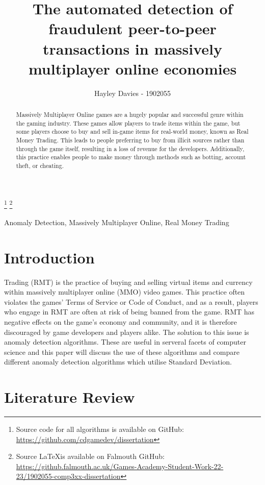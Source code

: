 \documentclass[journal]{IEEEtran}
\begin{document}
\title{The automated detection of fraudulent peer-to-peer transactions in massively multiplayer online economies}
\author{Hayley Davies - 1902055}

\maketitle
\footnote{Source code for all algorithms is available on GitHub: \url{https://github.com/cdgamedev/dissertation}}
\footnote{Source \LaTeX is available on Falmouth GitHub: \url{https://github.falmouth.ac.uk/Games-Academy-Student-Work-22-23/1902055-comp3xx-dissertation}}

\begin{abstract}
Massively Multiplayer Online games are a hugely popular and successful genre within the gaming industry. These games allow players to trade items within the game, but some players choose to buy and sell in-game items for real-world money, known as Real Money Trading. This leads to people preferring to buy from illicit sources rather than through the game itself, resulting in a loss of revenue for the developers. Additionally, this practice enables people to make money through methods such as botting, account theft, or cheating.
\end{abstract}

\begin{IEEEkeywords}
Anomaly Detection, Massively Multiplayer Online, Real Money Trading
\end{IEEEkeywords}

\section{Introduction}
 Trading (RMT) is the practice of buying and selling virtual items and currency within massively multiplayer online (MMO) video games. This practice often violates the games' Terms of Service or Code of Conduct\cite{AmazonGamesCOC}\cite{SquareEnixCOC}, and as a result, players who engage in RMT are often at risk of being banned from the game. RMT has negative effects on the game's economy and community, and it is therefore discouraged by game developers and players alike. The solution to this issue is anomaly detection algorithms. These are useful in serveral facets of computer science and this paper will discuss the use of these algorithms and compare different anomaly detection algorithms which utilise Standard Deviation.

\section{Literature Review}
\end{document}
